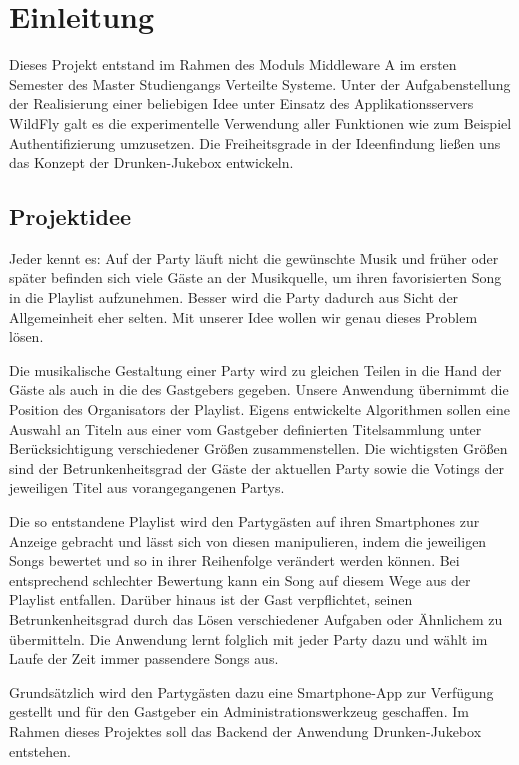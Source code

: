 \section{Einleitung}
Dieses Projekt entstand im Rahmen des Moduls Middleware A im ersten Semester des Master Studiengangs Verteilte Systeme. Unter der Aufgabenstellung der Realisierung einer beliebigen Idee unter Einsatz des Applikationsservers WildFly galt es die experimentelle Verwendung aller Funktionen wie zum Beispiel Authentifizierung umzusetzen.
Die Freiheitsgrade in der Ideenfindung ließen uns das Konzept der Drunken-Jukebox entwickeln.

\subsection{Projektidee}
Jeder kennt es: Auf der Party läuft nicht die gewünschte Musik und früher oder später befinden sich viele Gäste an der Musikquelle, um ihren favorisierten Song in die Playlist aufzunehmen. Besser wird die Party dadurch aus Sicht der Allgemeinheit eher selten. Mit unserer Idee wollen wir genau dieses Problem lösen.

Die musikalische Gestaltung einer Party wird zu gleichen Teilen in die Hand der Gäste als auch in die des Gastgebers gegeben. Unsere Anwendung übernimmt die Position des Organisators der Playlist. Eigens entwickelte Algorithmen sollen eine Auswahl an Titeln aus einer vom Gastgeber definierten Titelsammlung unter Berücksichtigung verschiedener Größen zusammenstellen. Die wichtigsten Größen sind der Betrunkenheitsgrad der Gäste der aktuellen Party sowie die Votings der jeweiligen Titel aus vorangegangenen Partys.

Die so entstandene Playlist wird den Partygästen auf ihren Smartphones zur Anzeige gebracht und lässt sich von diesen manipulieren, indem die jeweiligen Songs bewertet und so in ihrer Reihenfolge verändert werden können. Bei entsprechend schlechter Bewertung kann ein Song auf diesem Wege aus der Playlist entfallen. Darüber hinaus ist der Gast verpflichtet, seinen Betrunkenheitsgrad durch das Lösen verschiedener Aufgaben oder Ähnlichem zu übermitteln. Die Anwendung lernt folglich mit jeder Party dazu und wählt im Laufe der Zeit immer passendere Songs aus. 

Grundsätzlich wird den Partygästen dazu eine Smartphone-App zur Verfügung gestellt und für den Gastgeber ein Administrationswerkzeug geschaffen. Im Rahmen dieses Projektes soll das Backend der Anwendung Drunken-Jukebox entstehen. 